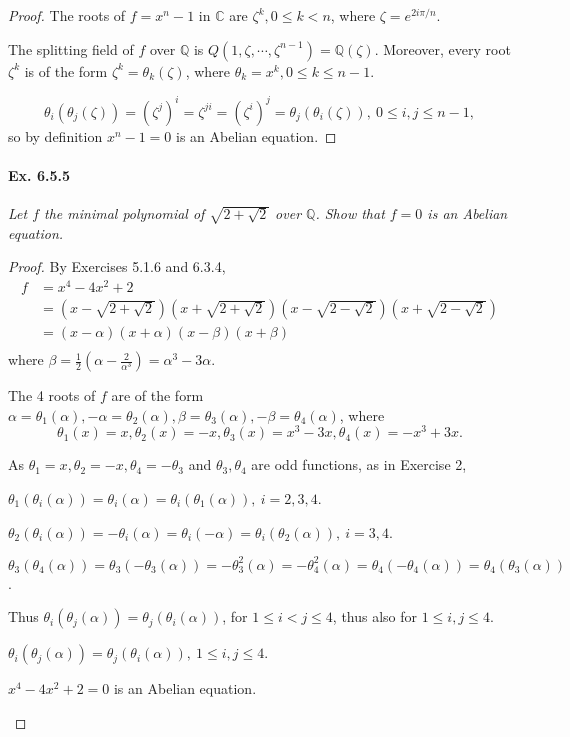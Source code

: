 \documentclass[11pt,a4paper]{article}
\newcommand{\Q}{\mathbb{Q}}
\newcommand{\C}{\mathbb{C}}
\begin{document}
\begin{proof}
The roots of $f=x^n-1$ in $\C$ are $\zeta^k, 0\leq k < n$, where $\zeta = e^{2i\pi/n}$.

The splitting field of $f$ over $\Q$ is $Q(1,\zeta,\cdots,\zeta^{n-1}) = \Q(\zeta)$. Moreover, every root $\zeta^k$ is of the form $\zeta^k = \theta_k(\zeta)$, where $\theta_k = x^k,0\leq k \leq n-1$.

$$\theta_i(\theta_j(\zeta)) = (\zeta^j)^i = \zeta^{ji} = (\zeta^i)^j = \theta_j(\theta_i(\zeta)),\ 0\leq i,j \leq n-1,$$ so by definition $x^n-1=0$ is an Abelian equation.
\end{proof}

\paragraph{Ex. 6.5.5}

{\it Let $f$ the minimal polynomial of $\sqrt{2+\sqrt{2}}$ over $\Q$. Show that $f=0$ is an Abelian equation.
}

\begin{proof}

By Exercises 5.1.6 and 6.3.4,
\begin{align*}
f&= x^4-4x^2+2\\
&= \left(x-\sqrt{2+\sqrt{2}}\right)\left(x+\sqrt{2+\sqrt{2}}\right)\left(x-\sqrt{2-\sqrt{2}}\right)\left(x+\sqrt{2-\sqrt{2}}\right)\\
&=(x-\alpha)(x+\alpha)(x-\beta)(x+\beta)\\
\end{align*}
where $\beta= \frac{1}{2}\left(\alpha- \frac{2}{\alpha^3}\right)  = \alpha^3-3\alpha$.

The 4 roots of $f$ are of the form $\alpha = \theta_1(\alpha), -\alpha = \theta_2(\alpha), \beta=\theta_3(\alpha), -\beta = \theta_4(\alpha)$, where
$$\theta_1(x) = x, \theta_2(x) = -x, \theta_3(x) = x^3-3x,\theta_4(x) = -x^3+3x.$$

As $\theta_1 = x, \theta_2 = -x, \theta_4 = -\theta_3$ and $\theta_3,\theta_4$ are odd functions, as in Exercise 2, 

 $\theta_1(\theta_i(\alpha)) = \theta_i(\alpha) = \theta_i(\theta_1(\alpha)),\ i=2,3,4$.

$\theta_2(\theta_i(\alpha)) = - \theta_i(\alpha) = \theta_i(-\alpha) = \theta_i(\theta_2(\alpha)),\ i=3,4$.

$\theta_3(\theta_4(\alpha)) = \theta_3(-\theta_3(\alpha)) = -\theta_3^2(\alpha) = -\theta_4^2(\alpha) = \theta_4(-\theta_4(\alpha)) = \theta_4(\theta_3(\alpha))$.

Thus $\theta_i(\theta_j(\alpha)) = \theta_j(\theta_i(\alpha))$, for $1\leq i <j\leq 4$, thus also for $1\leq i,j\leq 4$.

 $\theta_i(\theta_j(\alpha)) = \theta_j(\theta_i(\alpha)),\ 1\leq i,j\leq 4$. 
 \begin{center}
  $x^4-4x^2+2=0$ is an Abelian equation.
  \end{center}
\end{proof}
\end{document}
